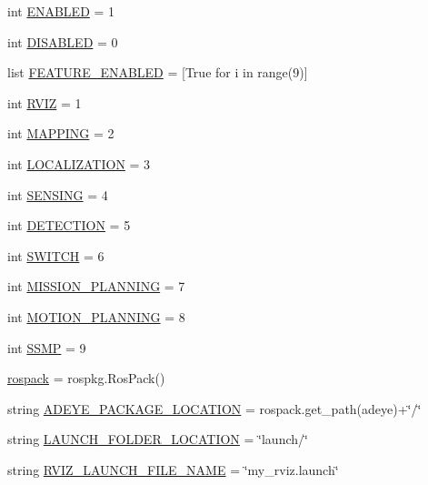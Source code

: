 \begin{DoxyCompactItemize}
\item 
int \hyperlink{namespacemanager_ad92224ba3bccfba54f5d53ee9e9f0e06}{E\+N\+A\+B\+L\+ED} = 1
\item 
int \hyperlink{namespacemanager_acc1a242f79d4757ccec1eafa25991b69}{D\+I\+S\+A\+B\+L\+ED} = 0
\item 
list \hyperlink{namespacemanager_a140ec9bdd4f59ede61032dec9dbd20e3}{F\+E\+A\+T\+U\+R\+E\+\_\+\+E\+N\+A\+B\+L\+ED} = \mbox{[}True for i in range(9)\mbox{]}
\item 
int \hyperlink{namespacemanager_a00b72dc43f7bcfd7f320277e59b9d565}{R\+V\+IZ} = 1
\item 
int \hyperlink{namespacemanager_a0246d765371fcedd6b0c05ee3e97c3ad}{M\+A\+P\+P\+I\+NG} = 2
\item 
int \hyperlink{namespacemanager_a716836983d025722ec1a015848efec7f}{L\+O\+C\+A\+L\+I\+Z\+A\+T\+I\+ON} = 3
\item 
int \hyperlink{namespacemanager_a07571ba2de9edb4dae0269f01bc691cc}{S\+E\+N\+S\+I\+NG} = 4
\item 
int \hyperlink{namespacemanager_a341e1745be0eb2382da0ea818411441c}{D\+E\+T\+E\+C\+T\+I\+ON} = 5
\item 
int \hyperlink{namespacemanager_a2dfd2e80a686fee05e1ade0e51fa5eee}{S\+W\+I\+T\+CH} = 6
\item 
int \hyperlink{namespacemanager_aa7776000dd1f368ae9e4672273662506}{M\+I\+S\+S\+I\+O\+N\+\_\+\+P\+L\+A\+N\+N\+I\+NG} = 7
\item 
int \hyperlink{namespacemanager_a6e5eb6ddb9305d2a2e9bafc6cf3a29b9}{M\+O\+T\+I\+O\+N\+\_\+\+P\+L\+A\+N\+N\+I\+NG} = 8
\item 
int \hyperlink{namespacemanager_a7c64b0011b346aa00685017ed03a6b72}{S\+S\+MP} = 9
\item 
\hyperlink{namespacemanager_af079b1840e898a44e8a8794f632c6747}{rospack} = rospkg.\+Ros\+Pack()
\item 
string \hyperlink{namespacemanager_a6b9923a9dbb3360028e139c3391d3a26}{A\+D\+E\+Y\+E\+\_\+\+P\+A\+C\+K\+A\+G\+E\+\_\+\+L\+O\+C\+A\+T\+I\+ON} = rospack.\+get\+\_\+path(\textquotesingle{}adeye\textquotesingle{})+\char`\"{}/\char`\"{}
\item 
string \hyperlink{namespacemanager_aade405cb0881d91b45085d7bc0f392fa}{L\+A\+U\+N\+C\+H\+\_\+\+F\+O\+L\+D\+E\+R\+\_\+\+L\+O\+C\+A\+T\+I\+ON} = \char`\"{}launch/\char`\"{}
\item 
string \hyperlink{namespacemanager_af8103724e7745859a07a898ea00a8dd0}{R\+V\+I\+Z\+\_\+\+L\+A\+U\+N\+C\+H\+\_\+\+F\+I\+L\+E\+\_\+\+N\+A\+ME} = \char`\"{}my\+\_\+rviz.\+launch\char`\"{}

\end{DoxyCompactItemize}
